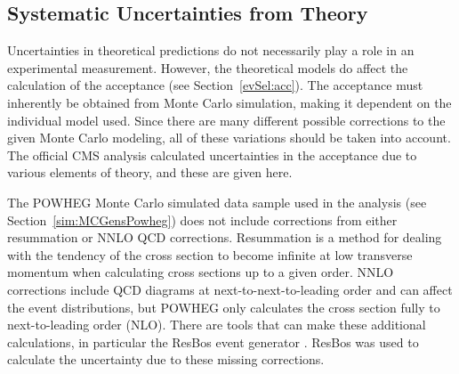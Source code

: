 \subsection{Systematic Uncertainties from Theory}
\label{anMeth:SystsTheory}



Uncertainties in theoretical predictions do not 
necessarily play a role in an experimental measurement.  
However, the theoretical models do affect the 
calculation of the acceptance (see Section~\ref{evSel:acc}).  
The acceptance must inherently be obtained from 
Monte Carlo simulation, making it dependent on the 
individual model used.  
Since there are many different possible corrections 
to the given Monte Carlo modeling, 
all of these variations should be taken into account.  
The official CMS \Zee analysis calculated \cite{CMSWZ} 
uncertainties in the acceptance due to 
various elements of theory, 
and these are given here.  




The POWHEG \cite{powheg} Monte Carlo simulated data sample used in the analysis 
(see Section~\ref{sim:MCGensPowheg}) 
does not include corrections from either resummation or 
NNLO QCD corrections.  
Resummation is a method for dealing with 
the tendency of the cross section 
to become infinite at low transverse momentum 
when calculating cross sections up to a given order.  
NNLO corrections include QCD diagrams at next-to-next-to-leading 
order and can affect the event distributions, 
but POWHEG only calculates the cross section 
fully to next-to-leading order (NLO).  
There are tools that can make these additional calculations, 
in particular the ResBos event generator \cite{resbos}. %
ResBos was used to 
calculate the uncertainty due to these missing corrections.  


